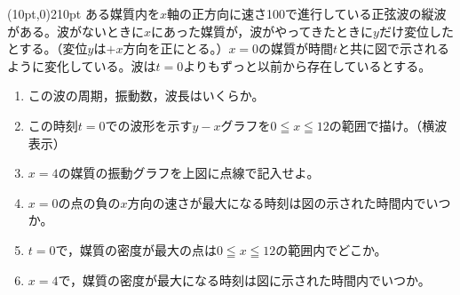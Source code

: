 \hakosyokika
\item
    \begin{mawarikomi}(10pt,0){210pt}{}
        ある媒質内を$x$軸の正方向に速さ100で進行している正弦波の縦波がある。波がないときに$x$にあった媒質が，波がやってきたときに$y$だけ変位したとする。（変位$y$は$+x$方向を正にとる。）$x=0$の媒質が時間$t$と共に図で示されるように変化している。波は$t=0$よりもずっと以前から存在しているとする。
        \begin{enumerate}
            \item この波の周期，振動数，波長はいくらか。
            \item この時刻$t=0$での波形を示す$y-x$グラフを$0\leqq x \leqq 12$の範囲で描け。（横波表示）
            \item $x=4$の媒質の振動グラフを上図に点線で記入せよ。
            \item $x=0$の点の負の$x$方向の速さが最大になる時刻は図の示された時間内でいつか。
            \item $t=0$で，媒質の密度が最大の点は$0\leqq x \leqq 12$の範囲内でどこか。
            \item $x=4$で，媒質の密度が最大になる時刻は図に示された時間内でいつか。
        \end{enumerate}
    \end{mawarikomi}